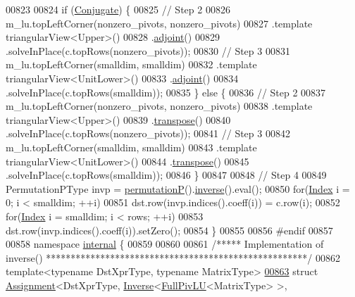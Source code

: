 \begin{DoxyCode}
00823 
00824   \textcolor{keywordflow}{if} (\hyperlink{class_eigen_1_1_conjugate}{Conjugate}) \{
00825     \textcolor{comment}{// Step 2}
00826     m\_lu.topLeftCorner(nonzero\_pivots, nonzero\_pivots)
00827         .template triangularView<Upper>()
00828         .\hyperlink{class_eigen_1_1_solver_base_a05a3686a89888681c8e0c2bcab6d1ce5}{adjoint}()
00829         .solveInPlace(c.topRows(nonzero\_pivots));
00830     \textcolor{comment}{// Step 3}
00831     m\_lu.topLeftCorner(smalldim, smalldim)
00832         .template triangularView<UnitLower>()
00833         .\hyperlink{class_eigen_1_1_solver_base_a05a3686a89888681c8e0c2bcab6d1ce5}{adjoint}()
00834         .solveInPlace(c.topRows(smalldim));
00835   \} \textcolor{keywordflow}{else} \{
00836     \textcolor{comment}{// Step 2}
00837     m\_lu.topLeftCorner(nonzero\_pivots, nonzero\_pivots)
00838         .template triangularView<Upper>()
00839         .\hyperlink{class_eigen_1_1_solver_base_a732e75b5132bb4db3775916927b0e86c}{transpose}()
00840         .solveInPlace(c.topRows(nonzero\_pivots));
00841     \textcolor{comment}{// Step 3}
00842     m\_lu.topLeftCorner(smalldim, smalldim)
00843         .template triangularView<UnitLower>()
00844         .\hyperlink{class_eigen_1_1_solver_base_a732e75b5132bb4db3775916927b0e86c}{transpose}()
00845         .solveInPlace(c.topRows(smalldim));
00846   \}
00847 
00848   \textcolor{comment}{// Step 4}
00849   PermutationPType invp = \hyperlink{group___l_u___module_a09274c82240f6441af5e6c99e24e756d}{permutationP}().\hyperlink{group___core___module_adb9af427f317202366c2832876064eb3}{inverse}().eval();
00850   \textcolor{keywordflow}{for}(\hyperlink{namespace_eigen_a62e77e0933482dafde8fe197d9a2cfde}{Index} i = 0; i < smalldim; ++i)
00851     dst.row(invp.indices().coeff(i)) = c.row(i);
00852   \textcolor{keywordflow}{for}(\hyperlink{namespace_eigen_a62e77e0933482dafde8fe197d9a2cfde}{Index} i = smalldim; i < rows; ++i)
00853     dst.row(invp.indices().coeff(i)).setZero();
00854 \}
00855 
00856 \textcolor{preprocessor}{#endif}
00857 
00858 \textcolor{keyword}{namespace }\hyperlink{namespaceinternal}{internal} \{
00859 
00860 
00861 \textcolor{comment}{/***** Implementation of inverse() *****************************************************/}
00862 \textcolor{keyword}{template}<\textcolor{keyword}{typename} DstXprType, \textcolor{keyword}{typename} MatrixType>
\hyperlink{struct_eigen_1_1internal_1_1_assignment_3_01_dst_xpr_type_00_01_inverse_3_01_full_piv_l_u_3_01_m9a195c884433725cd2990fc22dc66c56}{00863} \textcolor{keyword}{struct }\hyperlink{struct_eigen_1_1internal_1_1_assignment}{Assignment}<DstXprType, \hyperlink{class_eigen_1_1_inverse}{Inverse}<\hyperlink{group___l_u___module_class_eigen_1_1_full_piv_l_u}{FullPivLU}<MatrixType> >, 

\end{DoxyCode}
